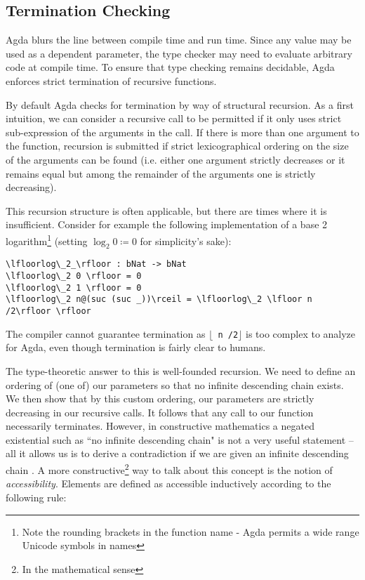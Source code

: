 \subsection{Termination Checking}
\label{sec:termination-checking}
Agda blurs the line between compile time and run time. Since any value may be used as a dependent parameter, the type checker may need to evaluate arbitrary code at compile time. To ensure that type checking remains decidable, Agda enforces strict termination of recursive functions.

By default Agda checks for termination by way of structural recursion. As a first intuition, we can consider a recursive call to be permitted if it only uses strict sub-expression of the arguments in the call. If there is more than one argument to the function, recursion is submitted if strict lexicographical ordering on the size of the arguments can be found (i.e. either one argument strictly decreases or it remains equal but among the remainder of the arguments one is strictly decreasing).

This recursion structure is often applicable, but there are times where it is insufficient. Consider for example the following implementation of a base 2 logarithm\footnote{Note the rounding brackets in the function name - Agda permits a wide range Unicode symbols in names} (setting $\log_2 0 \coloneqq 0$ for simplicity's sake):

\begin{lstlisting}[caption={Base 2 Logarithm (failing termination check)},label={lst:tutorial:log},emph={log}]
\lfloorlog\_2_\rfloor : bNat -> bNat
\lfloorlog\_2 0 \rfloor = 0
\lfloorlog\_2 1 \rfloor = 0
\lfloorlog\_2 n@(suc (suc _))\rceil = \lfloorlog\_2 \lfloor n /2\rfloor \rfloor
\end{lstlisting}

The compiler cannot guarantee termination as \texttt{$\lfloor$ n /2$\rfloor$} is too complex to analyze for Agda, even though termination is fairly clear to humans.

The type-theoretic answer to this is well-founded recursion. We need to define an ordering of (one of) our parameters so that no infinite descending chain exists. We then show that by this custom ordering, our parameters are strictly decreasing in our recursive calls. It follows that any call to our function necessarily terminates. However, in constructive mathematics a negated existential such as ``no infinite descending chain" is not a very useful statement -- all it allows us is to derive a contradiction if we are given an infinite descending chain \cite{mietek:2020:minimal}. A more constructive\footnote{In the mathematical sense} way to talk about this concept is the notion of \emph{accessibility}. Elements are defined as accessible inductively according to the following rule:

